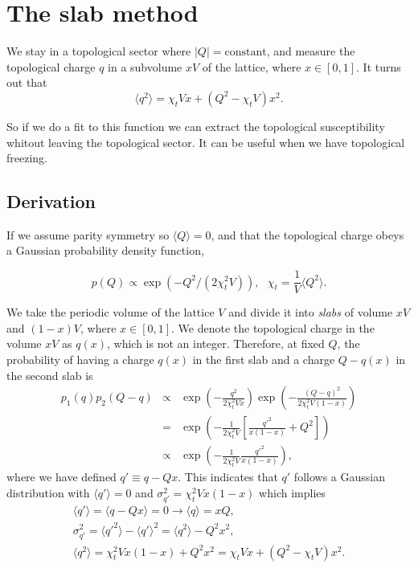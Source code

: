 \documentclass[12pt,a4paper]{article}
\begin{document}
\section{The slab method}
We stay in a topological sector where $|Q|=\text{constant}$, and measure the topological charge $q$ in a subvolume $xV$ of the lattice, where $x\in[0,1]$. It turns out that
\begin{equation}
    \langle q^2 \rangle = \chi_t V x + (Q^2 - \chi_t V ) x^2.  
\end{equation}

So if we do a fit to this function we can extract the topological susceptibility whitout leaving the topological sector. It can be useful when we have topological freezing. 


\subsection{Derivation}

If we assume parity symmetry so $\langle Q \rangle = 0$, and that the topological charge obeys a Gaussian probability density function,

\begin{equation}
    p(Q) \propto \exp(-Q^2/(2\chi_t^2V)), \ \ \ \chi_t = \frac{1}{V}\langle Q^2 \rangle.
\end{equation} 

We take the periodic volume of the lattice $V$ and divide it into \textit{slabs} of volume $xV$ and $(1-x)V$, where $x\in[0,1]$. We denote the topological charge in the volume $xV$ as $q(x)$, which is not an integer. Therefore, at fixed $Q$, the probability of having a charge $q(x)$ in the first slab and a charge $Q - q(x)$ in the second slab is
\begin{eqnarray}
    p_1(q) p_2(Q-q) & \propto & \exp\left(-\frac{q^2}{2\chi_t^2Vx}\right) \exp\left(-\frac{(Q-q)^2}{2\chi_t^2V(1-x)}\right) \nonumber\\
    & = & \exp\left(-\frac{1}{2\chi_t^2V}\left[ \frac{q'^2}{x(1-x)}+Q^2\right]\right) \nonumber \\
    & \propto & \exp\left(-\frac{1}{2\chi_t^2V}\frac{q'^2}{x(1-x)}\right),
\end{eqnarray}
where we have defined $q'\equiv q - Qx$. This indicates that $q'$ follows a Gaussian distribution with $\langle q' \rangle = 0$ and $\sigma_{q'}^2 = \chi_t^2 V x(1-x)$ which implies 
\begin{eqnarray}
    \langle q' \rangle = \langle q - Qx \rangle = 0 \rightarrow \langle q \rangle = xQ, \nonumber \\ 
\sigma_{q'}^2 = \langle q'^2 \rangle - \langle q' \rangle^2 = \langle q^2 \rangle -Q^2x^2, \nonumber \\
 \langle q^2 \rangle  = \chi_t^2 V x(1-x) + Q^2x^2 =  \chi_t V x + (Q^2 - \chi_t V ) x^2.
\end{eqnarray}
\end{document}
